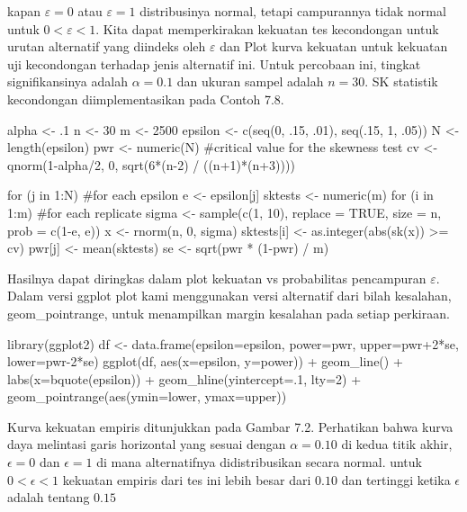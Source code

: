 \documentclass[a4paper,12pt]{article}
\theoremstyle{definition}
\begin{document}
kapan $\varepsilon =0$ atau $\varepsilon =1$ distribusinya normal, tetapi campurannya tidak normal untuk $0< \varepsilon < 1$. Kita dapat memperkirakan kekuatan tes kecondongan untuk
urutan alternatif yang diindeks oleh $\varepsilon$ dan Plot kurva kekuatan untuk kekuatan uji kecondongan terhadap jenis alternatif ini. Untuk percobaan ini, tingkat signifikansinya adalah $\alpha =0.1$ dan ukuran sampel adalah $ n = 30$.  SK statistik kecondongan diimplementasikan pada Contoh 7.8.
\begin{spverbatim}
alpha <- .1
n <- 30
m <- 2500
epsilon <- c(seq(0, .15, .01), seq(.15, 1, .05))
N <- length(epsilon)
pwr <- numeric(N)
#critical value for the skewness test
cv <- qnorm(1-alpha/2, 0, sqrt(6*(n-2) / ((n+1)*(n+3))))

for (j in 1:N) {      #for each epsilon
     e <- epsilon[j]
     sktests <- numeric(m)
     for (i in 1:m) { #for each replicate
          sigma <- sample(c(1, 10), replace = TRUE,
               size = n, prob = c(1-e, e))
          x <- rnorm(n, 0, sigma)
          sktests[i] <- as.integer(abs(sk(x)) >= cv)
          }
    pwr[j] <- mean(sktests)
    }
se <- sqrt(pwr * (1-pwr) / m)
\end{spverbatim}
Hasilnya dapat diringkas dalam plot kekuatan vs probabilitas pencampuran $\varepsilon$. Dalam versi ggplot plot kami menggunakan versi alternatif dari bilah kesalahan, geom\_pointrange,  untuk menampilkan margin kesalahan pada setiap perkiraan.
\begin{spverbatim}
    library(ggplot2)
    df <- data.frame(epsilon=epsilon, power=pwr,
             upper=pwr+2*se, lower=pwr-2*se)
    ggplot(df, aes(x=epsilon, y=power)) +
      geom_line() + labs(x=bquote(epsilon)) +
      geom_hline(yintercept=.1, lty=2) +
      geom_pointrange(aes(ymin=lower, ymax=upper))
\end{spverbatim}
Kurva kekuatan empiris ditunjukkan pada Gambar 7.2. Perhatikan bahwa kurva daya melintasi garis horizontal yang sesuai dengan $\alpha =0.10$ di kedua titik akhir, $\epsilon = 0$ dan $\epsilon =1$ di mana alternatifnya didistribusikan secara normal. untuk $0 < \epsilon < 1$ kekuatan empiris dari tes ini lebih besar dari $0.10$ dan tertinggi ketika $\epsilon$ adalah tentang $0.15$
\end{document}
